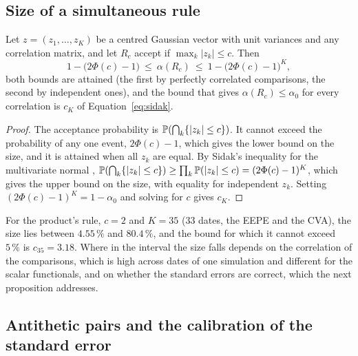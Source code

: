 \subsection{Size of a simultaneous rule}
\label{sec:theory-size}

\begin{proposition}\label{prop:size}
Let $z=(z_1,\dots,z_K)$ be a centred Gaussian vector with unit variances and any correlation matrix, and let $R_c$ accept if $\max_k\lvert z_k\rvert\le c$. Then
\begin{equation}
1-\bigl(2\Phi(c)-1\bigr)\ \le\ \alpha(R_c)\ \le\ 1-\bigl(2\Phi(c)-1\bigr)^{K},
\label{eq:size-bounds}
\end{equation}
both bounds are attained (the first by perfectly correlated comparisons, the second by independent ones), and the bound that gives $\alpha(R_c)\le\alpha_0$ for every correlation is $c_K$ of Equation~\eqref{eq:sidak}.
\end{proposition}
\begin{proof}
The acceptance probability is $\mathbb{P}(\bigcap_k\{\lvert z_k\rvert\le c\})$. It cannot exceed the probability of any one event, $2\Phi(c)-1$, which gives the lower bound on the size, and it is attained when all $z_k$ are equal. By Sidak's inequality for the multivariate normal \citep{sidak1967}, $\mathbb{P}(\bigcap_k\{\lvert z_k\rvert\le c\})\ge\prod_k\mathbb{P}(\lvert z_k\rvert\le c)=(2\Phi(c)-1)^{K}$, which gives the upper bound on the size, with equality for independent $z_k$. Setting $(2\Phi(c)-1)^{K}=1-\alpha_0$ and solving for $c$ gives $c_K$. \qedhere
\end{proof}

For the product's rule, $c=2$ and $K=35$ (33 dates, the EEPE and the CVA), the size lies between $4.55\,\%$ and $80.4\,\%$, and the bound for which it cannot exceed $5\,\%$ is $c_{35}=3.18$. Where in the interval the size falls depends on the correlation of the comparisons, which is high across dates of one simulation and different for the scalar functionals, and on whether the standard errors are correct, which the next proposition addresses.

\subsection{Antithetic pairs and the calibration of the standard error}
\label{sec:theory-antithetic}

